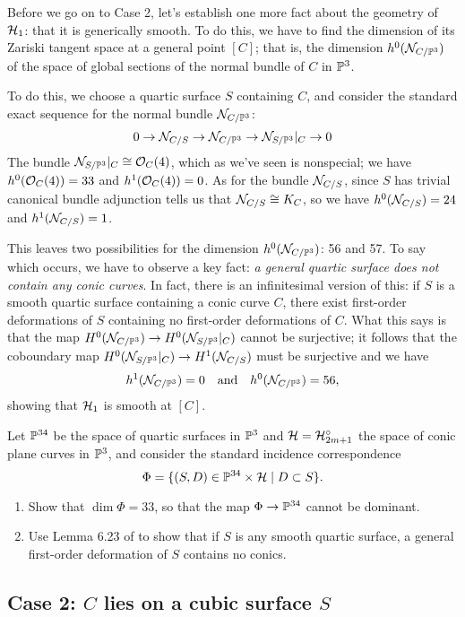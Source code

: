 Before we go on to Case 2, let's establish one more fact about the geometry of $\cH_1$: that it is generically smooth. To do this, we have to find the dimension of its Zariski tangent space at a general point $[C]$; that is, the dimension $h^0(\cN_{C/\PP^3})$ of the space of global sections of the normal bundle of $C$ in $\PP^3$.

To do this, we choose a quartic surface $S$ containing $C$, and consider the standard exact sequence for the normal bundle $\cN_{C/\PP^3}$:
$$
0 \to \cN_{C/S} \to \cN_{C/\PP^3} \to \cN_{S/\PP^3}|_C \to 0
$$
The bundle $\cN_{S/\PP^3}|_C \cong \cO_C(4)$, which as we've seen is nonspecial; we have $h^0(\cO_C(4)) = 33$ and $h^1(\cO_C(4)) = 0$. As for the bundle $\cN_{C/S}$,  since $S$ has trivial canonical bundle adjunction tells us that $\cN_{C/S} \cong K_C$, so we have $h^0(\cN_{C/S}) = 24$ and $h^1(\cN_{C/S}) = 1$.

This leaves two possibilities for the dimension $h^0(\cN_{C/\PP^3})$: 56 and 57. To say which occurs, we have to observe a key fact: \emph{a general quartic surface does not contain any conic curves}. In fact, there is an infinitesimal version of this: if $S$ is a smooth quartic surface containing a conic curve $C$, there exist first-order deformations of $S$ containing no first-order deformations of $C$. What this says is that the map
$H^0(\cN_{C/\PP^3}) \to H^0(\cN_{S/\PP^3}|_C)$ cannot be surjective; it follows that the coboundary map $H^0(\cN_{S/\PP^3}|_C) \to H^1(\cN_{C/S})$ must be surjective and we have
$$
h^1(\cN_{C/\PP^3}) = 0 \quad \text{and} \quad h^0(\cN_{C/\PP^3}) = 56,
$$
showing that $\cH_1$ is smooth at $[C]$.

\begin{exercise}
Let $\PP^{34}$ be the space of quartic surfaces in $\PP^3$ and $\cH = \cH^\circ_{2m+1}$ the space of conic plane curves in $\PP^3$, and consider the standard incidence correspondence
$$
\Phi = \{(S,D) \in \PP^{34} \times \cH \mid D \subset S \}.
$$
\begin{enumerate}
\item Show that $\dim \Phi = 33$, so that the map $\Phi \to \PP^{34}$ cannot be dominant.
\item Use Lemma 6.23 of \cite{3264} to show that if $S$ is any smooth quartic surface, a general first-order deformation of $S$ contains no conics.
\end{enumerate}
\end{exercise}


\subsection{Case 2: $C$ lies on a cubic surface $S$}

